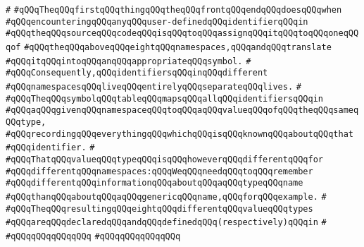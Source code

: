 \verb|#|\newline
\verb|#qQQqTheqQQqfirstqQQqthingqQQqtheqQQqfrontqQQqendqQQqdoesqQQqwhen|\newline
\verb|#qQQqencounteringqQQqanyqQQquser-definedqQQqidentifierqQQqin|\newline
\verb|#qQQqtheqQQqsourceqQQqcodeqQQqisqQQqtoqQQqassignqQQqitqQQqtoqQQqoneqQQqof|\newline
\verb|#qQQqtheqQQqaboveqQQqeightqQQqnamespaces,qQQqandqQQqtranslate|\newline
\verb|#qQQqitqQQqintoqQQqanqQQqappropriateqQQqsymbol.|\newline
\verb|#|\newline
\verb|#qQQqConsequently,qQQqidentifiersqQQqinqQQqdifferent|\newline
\verb|#qQQqnamespacesqQQqliveqQQqentirelyqQQqseparateqQQqlives.|\newline
\verb|#|\newline
\verb|#qQQqTheqQQqsymbolqQQqtableqQQqmapsqQQqallqQQqidentifiersqQQqin|\newline
\verb|#qQQqaqQQqgivenqQQqnamespaceqQQqtoqQQqaqQQqvalueqQQqofqQQqtheqQQqsameqQQqtype,|\newline
\verb|#qQQqrecordingqQQqeverythingqQQqwhichqQQqisqQQqknownqQQqaboutqQQqthat|\newline
\verb|#qQQqidentifier.|\newline
\verb|#|\newline
\verb|#qQQqThatqQQqvalueqQQqtypeqQQqisqQQqhoweverqQQqdifferentqQQqfor|\newline
\verb|#qQQqdifferentqQQqnamespaces:qQQqWeqQQqneedqQQqtoqQQqremember|\newline
\verb|#qQQqdifferentqQQqinformationqQQqaboutqQQqaqQQqtypeqQQqname|\newline
\verb|#qQQqthanqQQqaboutqQQqaqQQqgenericqQQqname,qQQqforqQQqexample.|\newline
\verb|#|\newline
\verb|#qQQqTheqQQqresultingqQQqeightqQQqdifferentqQQqvalueqQQqtypes|\newline
\verb|#qQQqareqQQqdeclaredqQQqandqQQqdefinedqQQq(respectively)qQQqin|\newline
\verb|#|\newline
\verb|#qQQqqQQqqQQqqQQq|\newline
\verb|#qQQqqQQqqQQqqQQq|\newline
